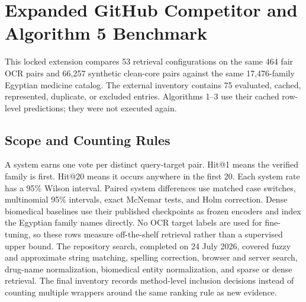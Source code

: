 \section{Expanded GitHub Competitor and Algorithm 5 Benchmark}
This locked extension compares 53 retrieval configurations on the same 464 fair OCR pairs and 66,257 synthetic clean-core pairs against the same 17,476-family Egyptian medicine catalog. The external inventory contains 75 evaluated, cached, represented, duplicate, or excluded entries. Algorithms 1--3 use their cached row-level predictions; they were not executed again.

\subsection{Scope and Counting Rules}
A system earns one vote per distinct query-target pair. Hit@1 means the verified family is first. Hit@20 means it occurs anywhere in the first 20. Each system rate has a 95\% Wilson interval. Paired system differences use matched case switches, multinomial 95\% intervals, exact McNemar tests, and Holm correction.
Dense biomedical baselines use their published checkpoints as frozen encoders and index the Egyptian family names directly. No OCR target labels are used for fine-tuning, so these rows measure off-the-shelf retrieval rather than a supervised upper bound.
The repository search, completed on 24 July 2026, covered fuzzy and approximate string matching, spelling correction, browser and server search, drug-name normalization, biomedical entity normalization, and sparse or dense retrieval. The final inventory records method-level inclusion decisions instead of counting multiple wrappers around the same ranking rule as new evidence.

